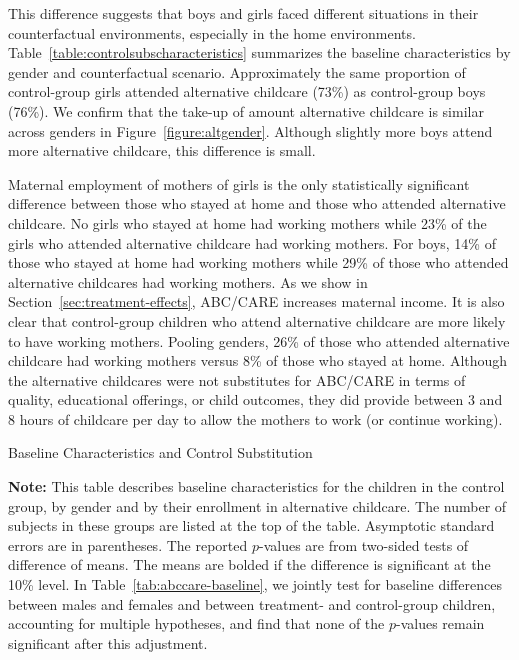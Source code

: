 This difference suggests that boys and girls faced different situations in their counterfactual environments, especially in the home environments. Table~\ref{table:controlsubscharacteristics} summarizes the baseline characteristics by gender and counterfactual scenario. Approximately the same proportion of control-group girls attended alternative childcare (73\%)  as control-group boys (76\%). We confirm that the take-up of amount alternative childcare is similar across genders in Figure~\ref{figure:altgender}. Although slightly more boys attend more alternative childcare, this difference is small.

Maternal employment of mothers of girls is the only statistically significant difference between those who stayed at home and those who attended alternative childcare. No girls who stayed at home had working mothers while 23\% of the girls who attended alternative childcare had working mothers. For boys, 14\% of those who stayed at home had working mothers while 29\% of those who attended alternative childcares had working mothers. As we show in Section~\ref{sec:treatment-effects}, ABC/CARE increases maternal income. It is also clear that control-group children who attend alternative childcare are more likely to have working mothers. Pooling genders, 26\% of those who attended alternative childcare had working mothers versus 8\% of those who stayed at home. Although the alternative childcares were not substitutes for ABC/CARE in terms of quality, educational offerings, or child outcomes, they did provide between 3 and 8 hours of childcare per day to allow the mothers to work (or continue working).

\begin{table}
\centering
\begin{threeparttable}
\caption{Baseline Characteristics and Control Substitution}\label{table:controlsubscharacteristics}

\begin{tablenotes}
\item \footnotesize \textbf{Note:} This table describes baseline characteristics for the children in the control group, by gender and by their enrollment in alternative childcare. The number of subjects in these groups are listed at the top of the table. Asymptotic standard errors are in parentheses. The reported $p$-values are from two-sided tests of difference of means. The means are bolded if the difference is significant at the 10\% level. In Table~\ref{tab:abccare-baseline}, we jointly test for baseline differences between males and females and between treatment- and control-group children, accounting for multiple hypotheses, and find that none of the $p$-values remain significant after this adjustment.
\end{tablenotes}
\end{threeparttable}
\end{table}

